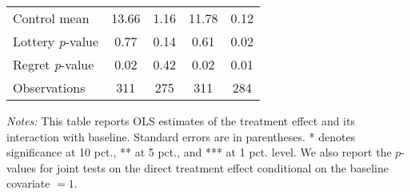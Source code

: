 \begin{table}[htbp]
{\begin{threeparttable}
\begin{tabular}{l*{4}{c}}
Control mean    &    13.66         &     1.16         &    11.78         &     0.12         \\
Lottery \emph{p}-value&     0.77         &     0.14         &     0.61         &     0.02         \\
Regret \emph{p}-value&     0.02         &     0.42         &     0.02         &     0.01         \\
Observations    &      311         &      275         &      311         &      284         \\
\bottomrule \end{tabular} \begin{tablenotes}[flushleft] \footnotesize \item \emph{Notes:} This table reports OLS estimates of the treatment effect and its interaction with baseline. Standard errors are in parentheses. * denotes significance at 10 pct., ** at 5 pct., and *** at 1 pct. level. We also report the \(p\)-values for joint tests on the direct treatment effect conditional on the baseline covariate $= 1$. \end{tablenotes} \end{threeparttable} } \end{table}

